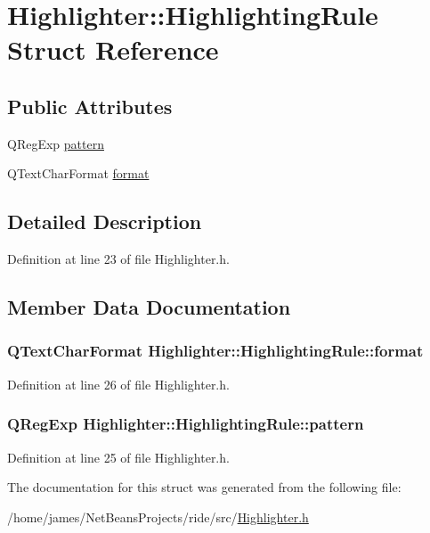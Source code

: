 \hypertarget{struct_highlighter_1_1_highlighting_rule}{\section{Highlighter\-:\-:Highlighting\-Rule Struct Reference}
\label{struct_highlighter_1_1_highlighting_rule}
}
\subsection*{Public Attributes}
\begin{DoxyCompactItemize}
\item 
Q\-Reg\-Exp \hyperlink{struct_highlighter_1_1_highlighting_rule_aaecab525cb637802e0c4a10e8832cd84}{pattern}
\item 
Q\-Text\-Char\-Format \hyperlink{struct_highlighter_1_1_highlighting_rule_ae0a636ba88b740accc9b98ca777b6fb4}{format}
\end{DoxyCompactItemize}


\subsection{Detailed Description}


Definition at line 23 of file Highlighter.\-h.



\subsection{Member Data Documentation}
\hypertarget{struct_highlighter_1_1_highlighting_rule_ae0a636ba88b740accc9b98ca777b6fb4}{
\subsubsection[{format}]{\setlength{\rightskip}{0pt plus 5cm}Q\-Text\-Char\-Format Highlighter\-::\-Highlighting\-Rule\-::format}}\label{struct_highlighter_1_1_highlighting_rule_ae0a636ba88b740accc9b98ca777b6fb4}


Definition at line 26 of file Highlighter.\-h.

\hypertarget{struct_highlighter_1_1_highlighting_rule_aaecab525cb637802e0c4a10e8832cd84}{
\subsubsection[{pattern}]{\setlength{\rightskip}{0pt plus 5cm}Q\-Reg\-Exp Highlighter\-::\-Highlighting\-Rule\-::pattern}}\label{struct_highlighter_1_1_highlighting_rule_aaecab525cb637802e0c4a10e8832cd84}


Definition at line 25 of file Highlighter.\-h.



The documentation for this struct was generated from the following file\-:\begin{DoxyCompactItemize}
\item 
/home/james/\-Net\-Beans\-Projects/ride/src/\hyperlink{_highlighter_8h}{Highlighter.\-h}\end{DoxyCompactItemize}
